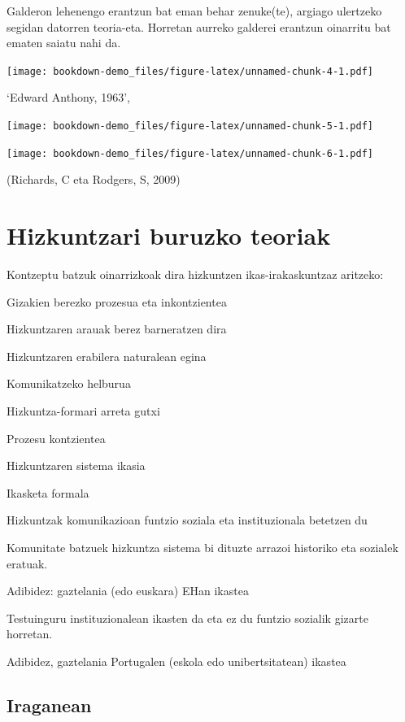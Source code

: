 \documentclass[]{book}
\providecommand{\tightlist}{%
  \setlength{\itemsep}{0pt}\setlength{\parskip}{0pt}}
\begin{document}
Galderon lehenengo erantzun bat eman behar zenuke(te), argiago ulertzeko segidan datorren teoria-eta. Horretan aurreko galderei erantzun oinarritu bat ematen saiatu nahi da.

\texttt{[image: bookdown-demo\_files/figure-latex/unnamed-chunk-4-1.pdf]}

`Edward Anthony, 1963',

\texttt{[image: bookdown-demo\_files/figure-latex/unnamed-chunk-5-1.pdf]}

\texttt{[image: bookdown-demo\_files/figure-latex/unnamed-chunk-6-1.pdf]}

(Richards, C eta Rodgers, S, 2009)

\hypertarget{hizkuntzari-buruzko-teoriak}{%
\section{Hizkuntzari buruzko teoriak}\label{hizkuntzari-buruzko-teoriak}}

Kontzeptu batzuk oinarrizkoak dira hizkuntzen ikas-irakaskuntzaz aritzeko:

\begin{description}
\tightlist
\item[Hizkuntza jabekuntza]
Gizakien berezko prozesua eta inkontzientea

Hizkuntzaren arauak berez barneratzen dira

Hizkuntzaren erabilera naturalean egina

Komunikatzeko helburua

Hizkuntza-formari arreta gutxi
\item[Hizkuntza ikaskuntza]
Prozesu kontzientea

Hizkuntzaren sistema ikasia

Ikasketa formala
\item[Bigarren Hizkuntza]
Hizkuntzak komunikazioan funtzio soziala eta instituzionala betetzen du

Komunitate batzuek hizkuntza sistema bi dituzte arrazoi historiko eta sozialek eratuak.

Adibidez: gaztelania (edo euskara) EHan ikastea
\item[Atzerriko Hizkuntza]
Testuinguru instituzionalean ikasten da eta ez du funtzio sozialik gizarte horretan.

Adibidez, gaztelania Portugalen (eskola edo unibertsitatean) ikastea
\end{description}

\hypertarget{iraganean}{%
\subsection{Iraganean}\label{iraganean}}
\end{document}
